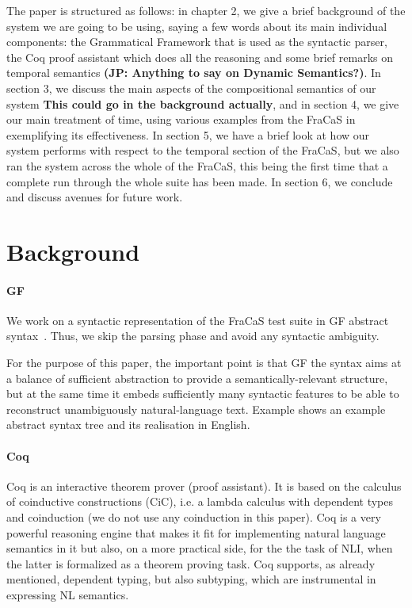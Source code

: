 \documentclass[a4paper,11pt]{article}
\begin{document}
The paper is structured as follows: in chapter 2, we give a brief background of the system we are going to be using, saying a few words about its main individual components: the Grammatical Framework that is used as the syntactic parser, the Coq proof assistant which does all the reasoning and some brief remarks on temporal semantics \textbf{(JP: Anything to say on Dynamic Semantics?)}. In section 3, we discuss the main aspects of the compositional semantics of our system \textbf{This could go in the background actually}, and in section 4, we give our main treatment of time, using various examples from the FraCaS in exemplifying its effectiveness. In section 5, we have a brief look at how our system performs with respect to the temporal section of the FraCaS, but we also ran the system across the whole of the FraCaS, this being the first time that a complete run through the whole suite has been made. In section 6, we conclude and discuss avenues for future work. 



\section{Background}

\paragraph{GF}
We work on a syntactic representation of the FraCaS test suite in GF
abstract syntax~\citep{Ljunglof:2012}. Thus, we skip the
parsing phase and avoid any syntactic ambiguity.

For the purpose of this paper, the important point is that GF the
syntax aims at a balance of sufficient abstraction to provide a
semantically-relevant structure, but at the same time it embeds
sufficiently many syntactic features to be able to reconstruct
unambiguously natural-language text. Example \label{ex:onelingex}
shows an example abstract syntax tree and its realisation in English.

\paragraph{Coq}
 Coq is an interactive theorem prover (proof assistant). It is based on the
calculus of coinductive constructions (CiC), i.e.  a lambda calculus
with dependent types and coinduction (we do not use any coinduction in this paper).  Coq is a very powerful reasoning engine
that makes it fit for implementing natural language semantics in it but also, on a more practical side, for the the task of NLI, when the latter is formalized
as a theorem proving task. Coq supports, as already mentioned,
 dependent typing, but also subtyping, which are instrumental in
expressing NL semantics.
\end{document}
